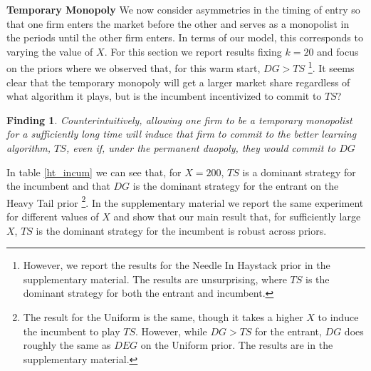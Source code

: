 \documentclass{article}
\theoremstyle{definition}
\newtheorem{finding}{Finding}
\begin{document}
\textbf{Temporary Monopoly} We now consider asymmetries in the timing of entry so that one firm enters the market before the other and serves as a monopolist in the periods until the other firm enters. In terms of our model, this corresponds to varying the value of $X$. For this section we report results fixing $k = 20$ and focus on the priors where we observed that, for this warm start, $DG > TS$ \footnote{However, we report the results for the Needle In Haystack prior in the supplementary material. The results are unsurprising, where $TS$ is the dominant strategy for both the entrant and incumbent.}. It seems clear that the temporary monopoly will get a larger market share regardless of what algorithm it plays, but is the incumbent incentivized to commit to $TS$?

\begin{finding}
\textit{Counterintuitively, allowing one firm to be a temporary monopolist for a sufficiently long time will induce that firm to commit to the better learning algorithm, $TS$, even if, under the permanent duopoly, they would commit to $DG$}
\end{finding}

In table \ref{ht_incum} we can see that, for $X = 200$, $TS$ is a dominant strategy for the incumbent and that $DG$ is the dominant strategy for the entrant on the Heavy Tail prior \footnote{The result for the Uniform is the same, though it takes a higher $X$ to induce the incumbent to play $TS$. However, while $DG > TS$ for the entrant, $DG$ does roughly the same as $DEG$ on the Uniform prior. The results are in the supplementary material.}. In the supplementary material we report the same experiment for different values of $X$ and show that our main result that, for sufficiently large $X$, $TS$ is the dominant strategy for the incumbent is robust across priors.
\end{document}
